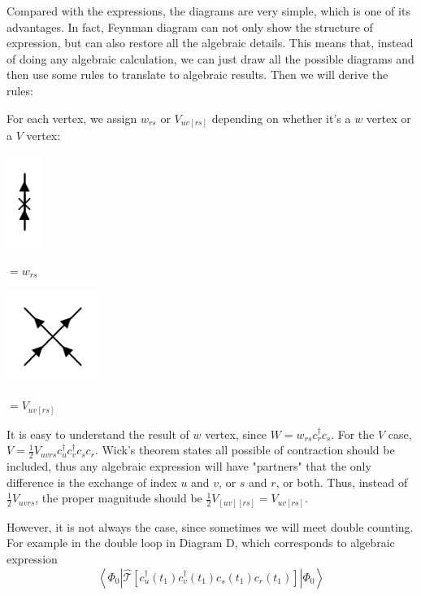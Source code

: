 Compared with the expressions, the diagrams are very simple, which is one of its advantages.
In fact, Feynman diagram can not only show the structure of expression, but can also restore all the algebraic details.
This means that, instead of doing any algebraic calculation, we can just draw all the possible diagrams and then use some rules to translate to algebraic results.
Then we will derive the rules:

For each vertex, we assign $w_{rs}$ or $V_{uv[rs]}$ depending on whether it's a $w$ vertex or a $V$ vertex:

\hspace{0.2\textwidth}
\begin{minipage}{0.08\textwidth}
	\includegraphics[height=3cm]{figures/vertexW.png}
\end{minipage}
\begin{minipage}{0.2\textwidth}
	$=w_{rs}$
\end{minipage}
\begin{minipage}{0.18\textwidth}
	\includegraphics[height=3cm]{figures/vertexV.png}
\end{minipage}
\begin{minipage}{0.1\textwidth}
	$=V_{uv[rs]}$
\end{minipage}

It is easy to understand the result of $w$ vertex, since $W=w_{rs} c_r^{\dagger} c_s$.
For the $V$ case, $V=\frac{1}{2}V_{uvrs} c_u^{\dagger} c_v^{\dagger} c_s c_r$.
Wick's theorem states all possible of contraction should be included, thus any algebraic expression will have "partners" that the only difference is the exchange of index $u$ and $v$, or $s$ and $r$, or both.
Thus, instead of $\frac{1}{2}V_{uvrs}$, the proper magnitude should be $\frac{1}{2}V_{[uv][rs]}=V_{uv[rs]}$.

However, it is not always the case, since sometimes we will meet double counting.
For example in the double loop in Diagram D, which corresponds to algebraic expression
\begin{equation}
	\left\langle\Phi_{0}\left|
	\hat{\mathcal{T}}\left[
		c_{u}^{\dagger}\left(t_{1}\right) 
		c_{v}^{\dagger}\left(t_{1}\right)
		c_{s}\left(t_{1}\right) 
		c_{r}\left(t_{1}\right)
	\right]
	\right| \Phi_{0}\right\rangle
\end{equation}

